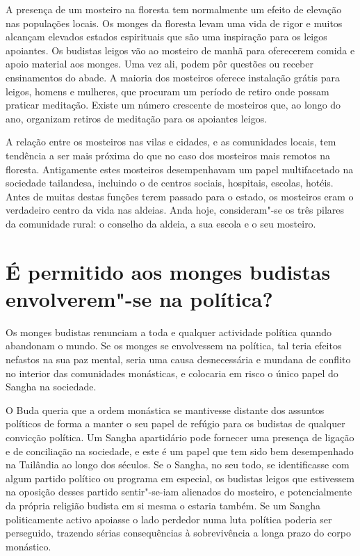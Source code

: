 A presença de um mosteiro na floresta tem normalmente um efeito de
elevação nas populações locais. Os monges da floresta levam uma vida de
rigor e muitos alcançam elevados estados espirituais que são uma
inspiração para os leigos apoiantes. Os budistas leigos vão ao mosteiro
de manhã para oferecerem comida e apoio material aos monges. Uma vez
ali, podem pôr questões ou receber ensinamentos do abade. A maioria dos
mosteiros oferece instalação grátis para leigos, homens e mulheres, que
procuram um período de retiro onde possam praticar meditação. Existe um
número crescente de mosteiros que, ao longo do ano, organizam retiros de
meditação para os apoiantes leigos.

A relação entre os mosteiros nas vilas e cidades, e as comunidades
locais, tem tendência a ser mais próxima do que no caso dos mosteiros
mais remotos na floresta. Antigamente estes mosteiros desempenhavam um
papel multifacetado na sociedade tailandesa, incluindo o de centros
sociais, hospitais, escolas, hotéis. Antes de muitas destas funções
terem passado para o estado, os mosteiros eram o verdadeiro centro da
vida nas aldeias. Anda hoje, consideram"-se os três pilares da comunidade
rural: o conselho da aldeia, a sua escola e o seu mosteiro.

\section{É permitido aos monges budistas envolverem"-se na política?}

Os monges budistas renunciam a toda e qualquer actividade política
quando abandonam o mundo. Se os monges se envolvessem na política, tal
teria efeitos nefastos na sua paz mental, seria uma causa desnecessária
e mundana de conflito no interior das comunidades monásticas, e
colocaria em risco o único papel do Sangha na sociedade.

O Buda queria que a ordem monástica se mantivesse distante dos assuntos
políticos de forma a manter o seu papel de refúgio para os budistas de
qualquer convicção política. Um Sangha apartidário pode fornecer uma
presença de ligação e de conciliação na sociedade, e este é um papel que
tem sido bem desempenhado na Tailândia ao longo dos séculos. Se o
Sangha, no seu todo, se identificasse com algum partido político ou
programa em especial, os budistas leigos que estivessem na oposição
desses partido sentir"-se-iam alienados do mosteiro, e potencialmente da
própria religião budista em si mesma o estaria também. Se um Sangha
politicamente activo apoiasse o lado perdedor numa luta política poderia
ser perseguido, trazendo sérias consequências à sobrevivência a longa
prazo do corpo monástico.

